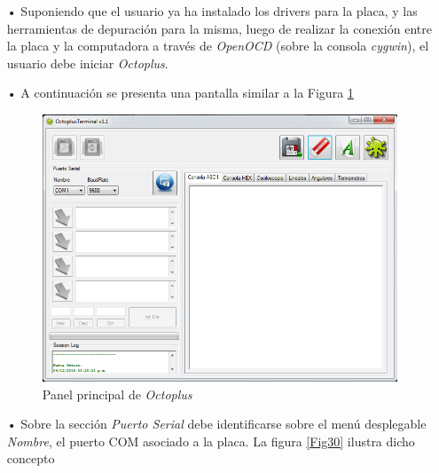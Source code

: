 \documentclass[12pt,letterpaper]{article}
\begin{document}
\begin{enumerate}
\item[•]Suponiendo que el usuario ya ha instalado los drivers para la placa, y las herramientas de depuración para la misma, luego de realizar la conexión entre la placa y la computadora a través de \textit{OpenOCD} (sobre la consola \textit{cygwin}), el usuario debe iniciar \textit{Octoplus}.
\item[•]A continuación se presenta una pantalla similar a la Figura \ref{Fig29}

\begin{center}
\begin{figure}[!h]
\centering
\includegraphics[width=6 cm]{figuras/f11.png}
\caption{Panel principal de \textit{Octoplus}}
\label{Fig29}
\end{figure}
\end{center}

\item[•]Sobre la sección \textit{Puerto Serial} debe identificarse sobre el menú desplegable \textit{Nombre}, el puerto COM asociado a la placa. La figura \ref{Fig30} ilustra dicho concepto


\end{enumerate}
\end{document}
